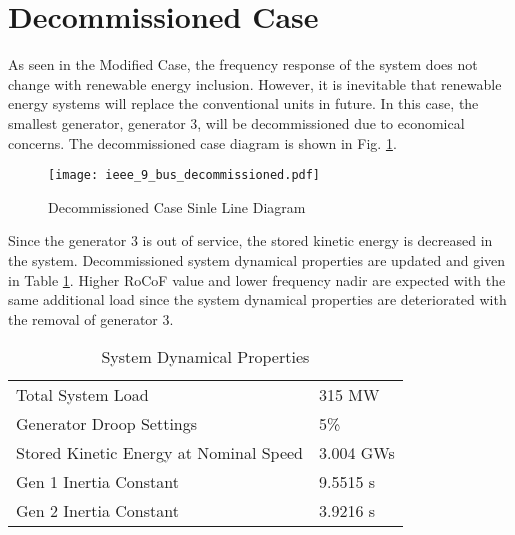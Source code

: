 \section{Decommissioned Case}
\label{sec:kdecommissioned}
As seen in the Modified Case, the frequency response of the system does not change with renewable energy inclusion. However, it is inevitable that renewable energy systems will replace the conventional units in future. In this case, the smallest generator, generator 3, will be decommissioned due to economical concerns. The decommissioned case diagram is shown in Fig. \ref{decommissioned_case}.\par
\begin{figure}[h!]
	\centering
	\texttt{[image: ieee\_9\_bus\_decommissioned.pdf]}
	\caption{Decommissioned Case Sinle Line Diagram}
	\label{decommissioned_case}
\end{figure}
Since the generator 3 is out of service, the stored kinetic energy is decreased in the system. Decommissioned system dynamical properties are updated and given in Table \ref{systemdynamicaldatacase3}. Higher RoCoF value and lower frequency nadir are expected with the same additional load since the system dynamical properties are deteriorated with the removal of generator 3.
\begin{table}[h]
	\centering
	\begin{tabular}{ll}
		\hline
		Total System Load                      & 315 MW    \\
		Generator Droop Settings               & 5\%       \\
		Stored Kinetic Energy at Nominal Speed & 3.004 GWs \\
		Gen 1 Inertia Constant                 & 9.5515 s  \\
		Gen 2 Inertia Constant                 & 3.9216 s  \\
		\hline
	\end{tabular}
	\caption{System Dynamical Properties}
	\label{systemdynamicaldatacase3}
\end{table}

